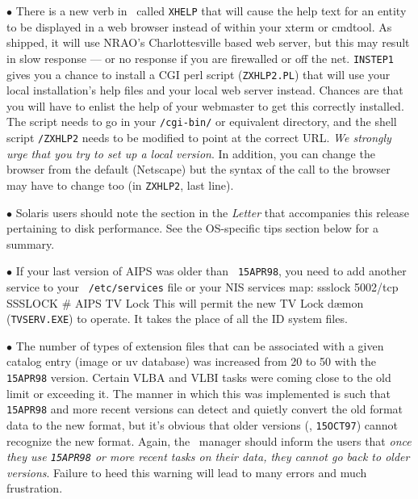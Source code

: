 \item{$\bullet$} There is a new verb in \AIPS\ called {\tt XHELP} that
  will cause the help text for an entity to be displayed in a web
  browser instead of within your xterm or cmdtool.  As shipped, it will
  use NRAO's Charlottesville based web server, but this may result in
  slow response --- or no response if you are firewalled or off the
  net.  {\tt INSTEP1} gives you a chance to install a CGI perl script
  ({\tt ZXHLP2.PL}) that will use your local installation's help files
  and your local web server instead.  Chances are that you will have to
  enlist the help of your webmaster to get this correctly installed.
  The script needs to go in your {\tt /cgi-bin/} or equivalent
  directory, and the shell script {\tt\SYSU /ZXHLP2} needs to be
  modified to point at the correct URL.  {\it We strongly urge that you
  try to set up a local version\/}.  In addition, you can change the
  browser from the default (Netscape) but the syntax of the call to the
  browser may have to change too (in {\tt ZXHLP2}, last line).

\item{$\bullet$} Solaris users should note the section in the \AIPS
  {\it Letter} that accompanies this release pertaining to disk
  performance.  See the OS-specific tips section below for a summary.

\item{$\bullet$} {If your last version of AIPS was older than {\tt
  15APR98}, you need to add another service to your {\tt
  /etc/services} file or your NIS services map:\medskip
\fortran
  ssslock         5002/tcp        SSSLOCK         # AIPS TV Lock
\endfortran
\medskip
  This will permit the new TV Lock d\ae mon ({\tt TVSERV.EXE}) to
  operate.  It takes the place of all the ID system files.
  }

\item{$\bullet$} The number of types of extension files that can be
  associated with a given catalog entry (image or uv database) was
  increased from 20 to 50 with the {\tt 15APR98} version.  Certain VLBA
  and VLBI tasks were coming close to the old limit or exceeding it.
  The manner in which this was implemented is such that {\tt 15APR98}
  and more recent versions can detect and quietly convert the old format
  data to the new format, but it's obvious that older versions (\eg,
  {\tt 15OCT97}) cannot recognize the new format.  Again, the \AIPS\
  manager should inform the users that {\it once they use {\tt 15APR98}
  or more recent tasks on their data, they cannot go back to older
  versions\/}.  Failure to heed this warning will lead to many errors
  and much frustration.

